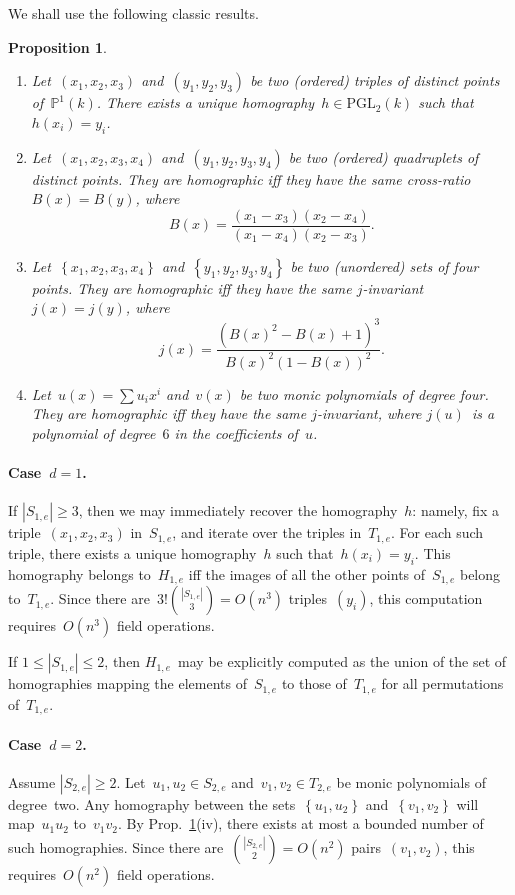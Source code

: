 \documentclass{article}%
\newtheorem{prop}{Proposition}
\def\acco#1{\left\{#1\right\}}
\def\abs#1{\left|#1\right|}
\def\card#1{\abs{#1}}
\begin{document}
We shall use the following classic results.
\begin{prop}\label{prop:homography}
\begin{enumerate}
\item Let~$(x_1, x_2, x_3)$ and~$(y_1, y_2, y_3)$ be two (ordered)
triples of distinct points of~$ℙ^1(k)$. There exists a unique
homography~$h ∈ \mathrm{PGL}_2(k)$ such that~$h(x_i) = y_i$.
\item Let~$(x_1, x_2, x_3, x_4)$ and~$(y_1, y_2, y_3, y_4)$ be two
(ordered) quadruplets of distinct points. They are homographic iff they
have the same cross-ratio~$B(x) = B(y)$, where
\begin{equation}
B(x) = \frac{(x_1-x_3)(x_2-x_4)}{(x_1-x_4)(x_2-x_3)}.
\end{equation}
\item Let~$\acco{x_1, x_2, x_3, x_4}$ and~$\acco{y_1, y_2, y_3, y_4}$ be
two (unordered) sets of four points. They are homographic iff they have
the same $j$-invariant~$j(x) = j(y)$, where
\begin{equation}
j(x) = \frac{(B(x)^2-B(x)+1)^3}{B(x)^2(1-B(x))^2}.
\end{equation}
\item Let~$u(x) = ∑ u_i x^i$ and~$v(x)$ be two monic polynomials
of degree four. They are homographic iff they have the same $j$-invariant,
where $j(u)$~is a polynomial of degree~$6$ in the coefficients of~$u$.
\end{enumerate}
\end{prop}


\paragraph{Case~$d = 1$.}
If $\card{S_{1,e}} ≥ 3$, then we may immediately recover the
homography~$h$: namely, fix a triple~$(x_1,x_2,x_3)$ in~$S_{1,e}$, and
iterate over the triples in~$T_{1,e}$. For each such triple, there exists
a unique homography~$h$ such that~$h(x_i) = y_i$. This homography belongs
to~$H_{1,e}$ iff the images of all the other points of~$S_{1,e}$ belong
to~$T_{1,e}$. Since there are~$3!\binom{\card{S_{1,e}}}{3} = O(n^3)$
triples~$(y_i)$, this computation requires~$O(n^3)$ field operations.

If $1 ≤ \card{S_{1,e}} ≤ 2$, then $H_{1,e}$~may be explicitly computed as
the union of the set of homographies mapping the elements of~$S_{1,e}$ to
those of~$T_{1,e}$ for all permutations of~$T_{1,e}$.

\paragraph{Case~$d = 2$.}
Assume $\card{S_{2,e}} ≥ 2$. Let~$u_1, u_2 ∈ S_{2,e}$ and~$v_1, v_2 ∈
T_{2,e}$ be monic polynomials of degree~two. Any homography between the
sets~$\acco{u_1, u_2}$ and~$\acco{v_1, v_2}$ will map~$u_1 u_2$ to~$v_1
v_2$. By Prop.~\ref{prop:homography}(iv), there exists at most a bounded
number of such homographies. Since there are~$\binom{\card{S_{2,e}}}{2} =
O(n^2)$ pairs~$(v_1, v_2)$, this requires~$O(n^2)$ field operations.
\end{document}
